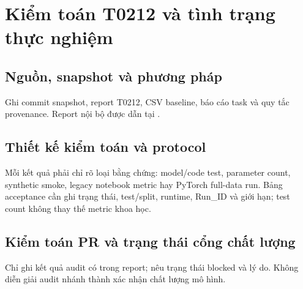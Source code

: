 \chapter{Kiểm toán T0212 và tình trạng thực nghiệm}
\section{Nguồn, snapshot và phương pháp}
Ghi commit snapshot, report T0212, CSV baseline, báo cáo task và quy tắc provenance. Report nội bộ được dẫn tại \cite{btl03_t0212_internal}.

\section{Thiết kế kiểm toán và protocol}
Mỗi kết quả phải chỉ rõ loại bằng chứng: model/code test, parameter count, synthetic smoke, legacy notebook metric hay PyTorch full-data run. Bảng acceptance cần ghi trạng thái, test/split, runtime, Run_ID và giới hạn; test count không thay thế metric khoa học.

\section{Kiểm toán PR và trạng thái cổng chất lượng}
Chỉ ghi kết quả audit có trong report; nêu trạng thái blocked và lý do. Không diễn giải audit nhánh thành xác nhận chất lượng mô hình.

